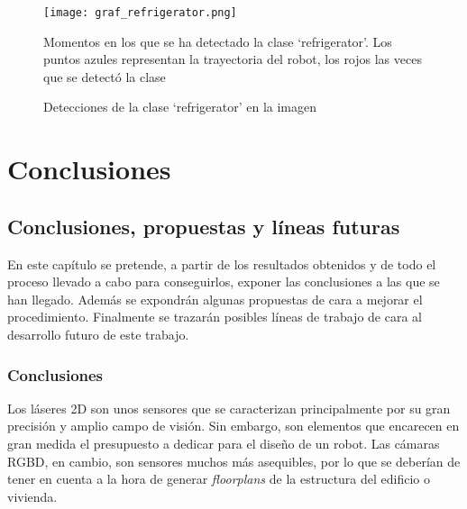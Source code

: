 \begin{figure}[h]
	\begin{center} 
		\texttt{[image: graf\_refrigerator.png]}
	\end{center}
	\caption{Momentos en los que se ha detectado la clase `refrigerator'. Los puntos azules representan la trayectoria del robot, los rojos las veces que se detectó la clase}
	\label{fig:graf_refrigerator}
\end{figure}

\begin{figure}[H]
 \centering
  \hspace{0.5cm}
 \caption{Detecciones de la clase `refrigerator' en la imagen}
 \label{fig:det_refrigerator}
\end{figure}

\part{Conclusiones}

\chapter{Conclusiones, propuestas y líneas futuras}

En este capítulo se pretende, a partir de los resultados obtenidos y de todo el proceso llevado a cabo para conseguirlos, exponer las conclusiones a las que se han llegado. Además se expondrán algunas propuestas de cara a mejorar el procedimiento. Finalmente se trazarán posibles líneas de trabajo de cara al desarrollo futuro de este trabajo.\\

\section{Conclusiones}

Los láseres 2D son unos sensores que se caracterizan principalmente por su gran precisión y amplio campo de visión. Sin embargo, son elementos que encarecen en gran medida el presupuesto a dedicar para el diseño de un robot. Las cámaras RGBD, en cambio, son sensores muchos más asequibles, por lo que se deberían de tener en cuenta a la hora de generar \textit{floorplans} de la estructura del edificio o vivienda.\\

